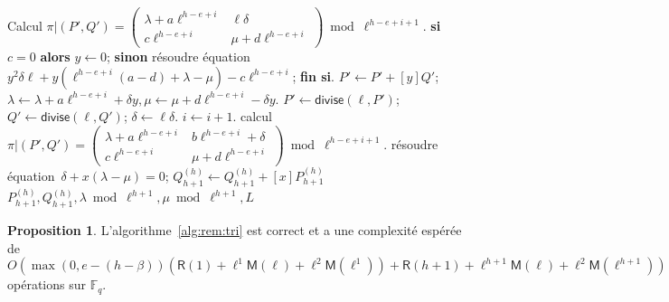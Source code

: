 \documentclass[10pt,a4paper]{book}
\theoremstyle{plain}
\theoremstyle{definition}
\theoremstyle{definition}
\theoremstyle{definition}
\newtheorem{prop}[thm]{Proposition}
\theoremstyle{definition}
\theoremstyle{remark}
\theoremstyle{remark}
\theoremstyle{definition}
\begin{document}
\begin{algorithm}
\begin{algorithmic}[1]
\STATE\label{alg:rem:tri:rem:frobenius}
  Calcul $\pi|(P',Q')=\left( \begin{smallmatrix}
\lambda + a \ell^{h-e+i}  & \ell \delta \\
c\ell^{h-e+i} & \mu + d \ell^{h-e+i}  \end{smallmatrix} \right) \bmod {\ell^{h-e+i+1}}.$
\STATE 
  \textbf{si} $c=0$ \textbf{alors} $y \leftarrow 0 $; 
\STATE\label{alg:rem:tri:rem:solve1}
  \textbf{sinon} résoudre équation
  $ y^2 \delta \ell + y (\ell^{h-e+i}(a-d)+\lambda - \mu) - c\ell^{h-e+i} $; \textbf{fin si}.
\STATE \label{alg:rem:tri:chgvrbl0}
  $P' \leftarrow P' + [y] Q'$; $\lambda \leftarrow \lambda + a \ell^{h-e+i} + \delta y, \mu \leftarrow \mu + d \ell^{h-e+i} -\delta y$.
\STATE\label{alg:rem:tri:trigonal:divide}
  $P' \leftarrow \mathsf{divise}(\ell, P')$; $Q' \leftarrow \mathsf{divise} (\ell, Q')$; $\delta \leftarrow \ell \delta $.
\STATE $i \leftarrow i+1$.
\STATE\label{alg:rem:tri:trigonal:frob}  calcul $\pi|(P',Q')=\left( \begin{smallmatrix}
\lambda + a\ell^{h-e+i} & b\ell^{h-e+i} + \delta\\
c\ell^{h-e+i} & \mu + d\ell^{h-e+i} \end{smallmatrix} \right) \bmod {\ell^{h-e+i+1}}.$  
\ENDWHILE \label{alg:rem:tri:trigonal:fin}
\STATE \label{alg:rem:tri:init:dia}
résoudre équation~$\delta + x(\lambda - \mu) = 0$;
\STATE  \label{alg:rem:tri:chgvrbl1}
$Q_{h+1}^{(h)} \leftarrow Q_{h+1}^{(h)}+[x]P_{h+1}^{(h)}$
\RETURN $P_{h+1}^{(h)},Q_{h+1}^{(h)}, \lambda \bmod \ell^{h+1}, \mu \bmod \ell^{h+1}, L$
\end{algorithmic}
\end{algorithm}
\begin{prop}
\label{pro:alg:rem:tri:hor}
L'algorithme~\ref{alg:rem:tri} est correct et a une complexité espérée de 
\[
O(\max(0,e-(h-\beta))(\mathsf{R}(1)+
\ell^{1}\mathsf{M}(\ell)+\ell^2 \mathsf{M}(\ell^{1}))+\mathsf{R}(h+1)+
\ell^{h+1}\mathsf{M}(\ell)+\ell^2 \mathsf{M}(\ell^{h+1}))\] 
opérations sur $\mathbb{F}_q$.
\end{prop}
\end{document}
